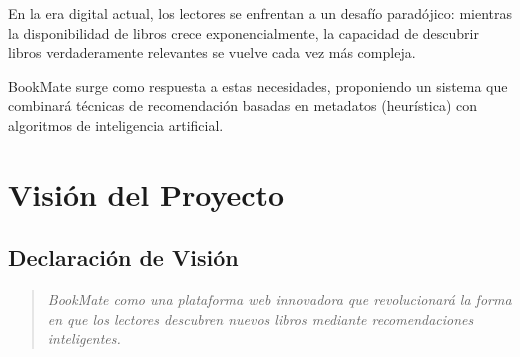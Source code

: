 En la era digital actual, los lectores se enfrentan a un desafío paradójico: mientras la disponibilidad de libros crece exponencialmente, la capacidad de descubrir libros verdaderamente relevantes se vuelve cada vez más compleja.

BookMate surge como respuesta a estas necesidades, proponiendo un sistema que combinará técnicas de recomendación basadas en metadatos (heurística) con algoritmos de inteligencia artificial.

\section{Visión del Proyecto}

\subsection{Declaración de Visión}

\begin{quote}
\textit{ BookMate como una plataforma web innovadora que revolucionará la forma en que los lectores descubren nuevos libros mediante recomendaciones inteligentes.}
\end{quote}

\newpage
\printbibliography[heading=bibintoc,title={Referencias}]


